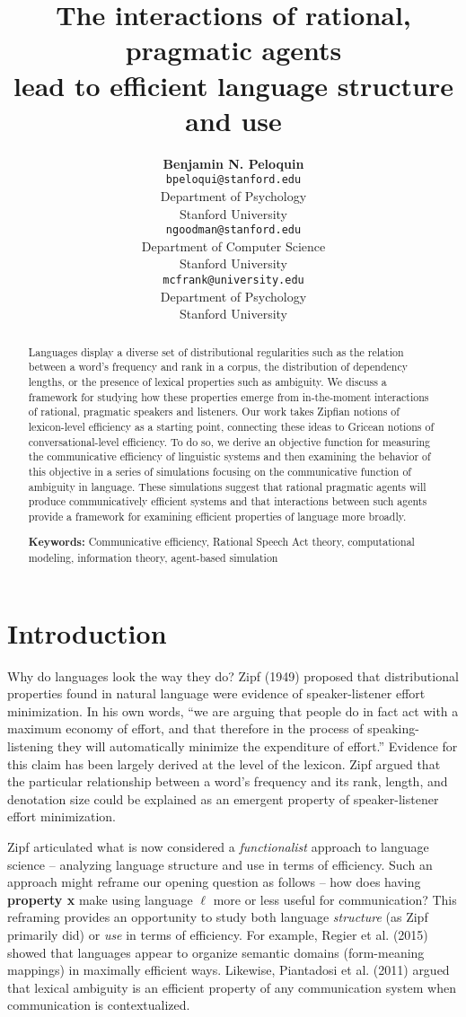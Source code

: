 \documentclass[10pt, letterpaper]{article}
\title{The interactions of rational, pragmatic agents\\
lead to efficient language structure and use}
\author{{\large \bf Benjamin N. Peloquin} \\ \texttt{bpeloqui@stanford.edu} \\ Department of Psychology \\ Stanford University \And {\large \bf Noah D. Goodman} \\ \texttt{ngoodman@stanford.edu} \\ Department of Computer Science \\ Stanford University \And {\large \bf Michael C. Frank} \\ \texttt{mcfrank@university.edu} \\ Department of Psychology \\ Stanford University}
\begin{document}
\maketitle

\begin{abstract}
Languages display a diverse set of distributional regularities such as
the relation between a word's frequency and rank in a corpus, the
distribution of dependency lengths, or the presence of lexical
properties such as ambiguity. We discuss a framework for studying how
these properties emerge from in-the-moment interactions of rational,
pragmatic speakers and listeners. Our work takes Zipfian notions of
lexicon-level efficiency as a starting point, connecting these ideas to
Gricean notions of conversational-level efficiency. To do so, we derive
an objective function for measuring the communicative efficiency of
linguistic systems and then examining the behavior of this objective in
a series of simulations focusing on the communicative function of
ambiguity in language. These simulations suggest that rational pragmatic
agents will produce communicatively efficient systems and that
interactions between such agents provide a framework for examining
efficient properties of language more broadly.

\textbf{Keywords:}
Communicative efficiency, Rational Speech Act theory, computational
modeling, information theory, agent-based simulation
\end{abstract}

\section{Introduction}\label{introduction}

Why do languages look the way they do? Zipf (1949) proposed that
distributional properties found in natural language were evidence of
speaker-listener effort minimization. In his own words, ``we are arguing
that people do in fact act with a maximum economy of effort, and that
therefore in the process of speaking-listening they will automatically
minimize the expenditure of effort.'' Evidence for this claim has been
largely derived at the level of the lexicon. Zipf argued that the
particular relationship between a word's frequency and its rank, length,
and denotation size could be explained as an emergent property of
speaker-listener effort minimization. \par

Zipf articulated what is now considered a \emph{functionalist} approach
to language science -- analyzing language structure and use in terms of
efficiency. Such an approach might reframe our opening question as
follows -- how does having \textbf{property x} make using language
\(\ell\) more or less useful for communication? This reframing provides
an opportunity to study both language \emph{structure} (as Zipf
primarily did) or \emph{use} in terms of efficiency. For example, Regier
et al. (2015) showed that languages appear to organize semantic domains
(form-meaning mappings) in maximally efficient ways. Likewise,
Piantadosi et al. (2011) argued that lexical ambiguity is an efficient
property of any communication system when communication is
contextualized.\par
\end{document}

